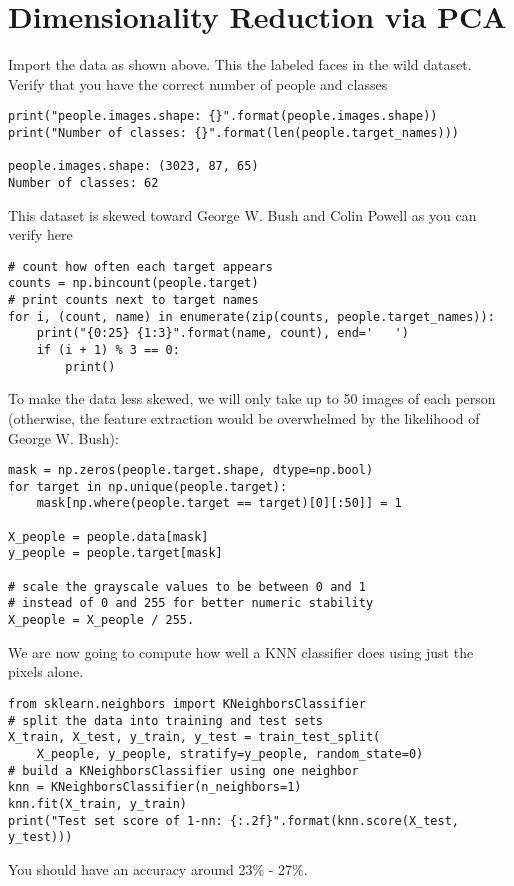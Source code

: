 \documentclass[12pt]{article}
\begin{document}
\section{Dimensionality Reduction via PCA}\label{pca}
Import the data as shown above.  This the labeled faces in the wild dataset.  \\
Verify that you have the correct number of people and classes \\
\vspace{1cm}
\begin{lstlisting}
print("people.images.shape: {}".format(people.images.shape))
print("Number of classes: {}".format(len(people.target_names)))

people.images.shape: (3023, 87, 65)
Number of classes: 62
\end{lstlisting} 
\vspace{1cm}
This dataset is skewed toward George W. Bush and Colin Powell as you can verify here \\
\vspace{1cm}
\begin{lstlisting}
# count how often each target appears
counts = np.bincount(people.target)
# print counts next to target names
for i, (count, name) in enumerate(zip(counts, people.target_names)):
    print("{0:25} {1:3}".format(name, count), end='   ')
    if (i + 1) % 3 == 0:
        print()
\end{lstlisting} 
\vspace{1cm}
To make the data less skewed, we will only take up to 50 images of each person (otherwise, the feature extraction would be overwhelmed by the likelihood of George W. Bush): \\
\vspace{1cm}
\begin{lstlisting}
mask = np.zeros(people.target.shape, dtype=np.bool)
for target in np.unique(people.target):
    mask[np.where(people.target == target)[0][:50]] = 1

X_people = people.data[mask]
y_people = people.target[mask]

# scale the grayscale values to be between 0 and 1
# instead of 0 and 255 for better numeric stability
X_people = X_people / 255.
\end{lstlisting} 
\vspace{1cm}

We are now going to compute how well a KNN classifier does using just the pixels alone.  
\vspace{1cm}
\begin{lstlisting}
from sklearn.neighbors import KNeighborsClassifier
# split the data into training and test sets
X_train, X_test, y_train, y_test = train_test_split(
    X_people, y_people, stratify=y_people, random_state=0)
# build a KNeighborsClassifier using one neighbor
knn = KNeighborsClassifier(n_neighbors=1)
knn.fit(X_train, y_train)
print("Test set score of 1-nn: {:.2f}".format(knn.score(X_test, y_test)))
\end{lstlisting} 
\vspace{1cm}
You should have an accuracy around 23\% - 27\%. \\
\end{document}
